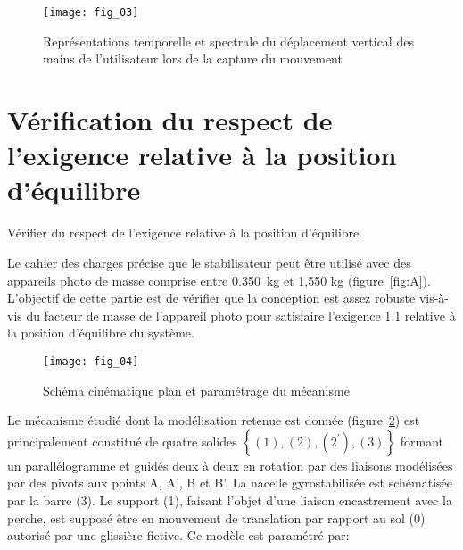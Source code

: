 \begin{figure}[H]
\centering
\texttt{[image: fig\_03]}
\caption{\label{fig:03} Représentations temporelle et spectrale du déplacement vertical des mains de l'utilisateur lors de la capture du mouvement}
\end{figure}
 
\ifprof
\begin{corrige}
\end{corrige}
\else
\fi

\ifprof
\begin{corrige}
\end{corrige}
\else
\fi

\section{\label{part:2} Vérification du respect de l'exigence relative à la position d'équilibre}
\begin{obj}
Vérifier du respect de l'exigence relative à la position d'équilibre.
\end{obj}
Le cahier des charges précise que le stabilisateur peut être utilisé avec des appareils photo de masse comprise entre \SI{0,350}{kg} et 1,550 kg (figure~\ref{fig:A}). L'objectif de cette partie est de vérifier que la conception est assez robuste vis-à-vis du facteur de masse de l'appareil photo pour satisfaire l'exigence 1.1 relative à la position d'équilibre du système.


\begin{figure}[H]
\centering
\texttt{[image: fig\_04]}
\caption{\label{fig:04} Schéma cinématique plan et paramétrage du mécanisme}
\end{figure}



Le mécanisme étudié dont la modélisation retenue est donnée (figure~\ref{fig:04}) est principalement constitué de quatre solides $\left\{(1),(2),\left(2^{\prime}\right),(3)\right\}$ formant un parallélogramme et guidés deux à deux en rotation par des liaisons modélisées par des pivots aux points A, A', B et B'. La nacelle gyrostabilisée est schématisée par la barre (3). Le support (1), faisant l'objet d'une liaison encastrement avec la perche, est supposé être en mouvement de translation par rapport au sol (0) autorisé par une glissière fictive. Ce modèle est paramétré par:


